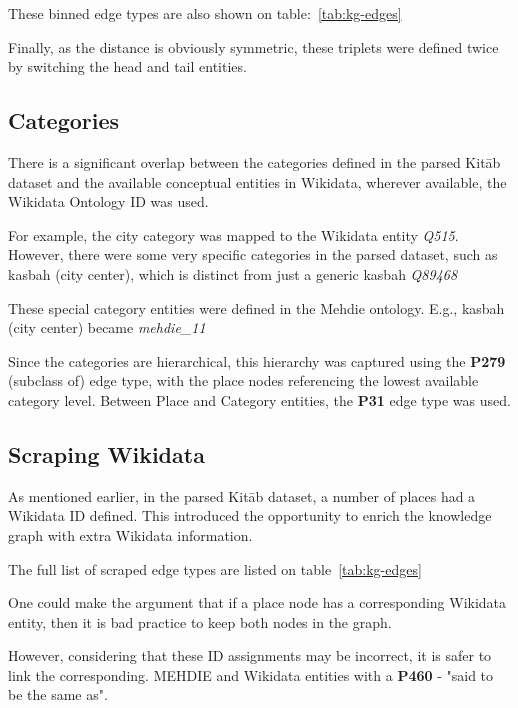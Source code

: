 These binned edge types are also shown on table:~\ref{tab:kg-edges}

Finally, as the distance is obviously symmetric, these triplets were defined twice by switching the head and tail
entities.
\subsection{Categories}\label{subsec:categories}
There is a significant overlap between the categories defined in the parsed Kitāb dataset and the available
conceptual entities in Wikidata, wherever available, the Wikidata Ontology ID was used.

For example, the city category was mapped to the Wikidata entity \textit{Q515}.
However, there were some very specific categories in the parsed dataset, such
as kasbah (city center), which is distinct from just a generic kasbah \textit{Q89468}

These special category entities were defined in the Mehdie ontology.
E.g., kasbah (city center) became \textit{mehdie\_11}

Since the categories are hierarchical, this hierarchy was captured using the \textbf{P279}
(subclass of) edge type, with the place nodes referencing the lowest available category level.
Between Place and Category entities, the \textbf{P31} edge type was used.

\subsection{Scraping Wikidata}
As mentioned earlier, in the parsed Kitāb dataset, a number of places had a Wikidata ID defined.
This introduced the opportunity to enrich the knowledge graph with extra Wikidata information.

The full list of scraped edge types are listed on table~\ref{tab:kg-edges}

One could make the argument that if a place node has a corresponding Wikidata entity,
then it is bad practice to keep both nodes in the graph.

However, considering that these ID assignments may be incorrect, it is safer to link the corresponding.
MEHDIE and Wikidata entities with a \textbf{P460} - "said to be the same as".

